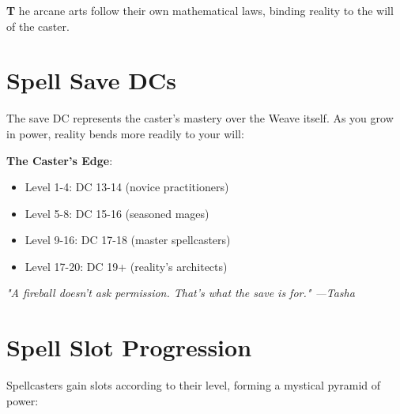 \documentclass[11pt,letterpaper,openany]{book}
\newcommand{\firstletter}[1]{%
    \textcolor{bloodred}{\fontsize{48}{48}\selectfont\bfseries #1}%
}
\newcommand{\fantasyquote}[1]{%
\begin{center}
\textit{\large #1}
\end{center}
}
\begin{document}
\firstletter{T}he arcane arts follow their own mathematical laws, binding reality to the will of the caster.

\section{Spell Save DCs}

The save DC represents the caster's mastery over the Weave itself. As you grow in power, reality bends more readily to your will:

\textbf{The Caster's Edge}:
\begin{itemize}
    \item Level 1-4: DC 13-14 (novice practitioners)
    \item Level 5-8: DC 15-16 (seasoned mages)
    \item Level 9-16: DC 17-18 (master spellcasters)
    \item Level 17-20: DC 19+ (reality's architects)
\end{itemize}

\fantasyquote{"A fireball doesn't ask permission. That's what the save is for." —Tasha}

\section{Spell Slot Progression}

Spellcasters gain slots according to their level, forming a mystical pyramid of power:
\end{document}
